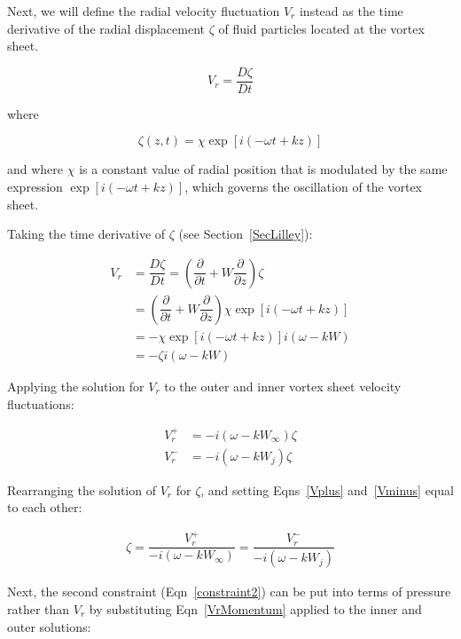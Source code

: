 \documentclass[]{aiaa-tc}%
\begin{document}
Next, we will define the radial velocity fluctuation $V_r$ instead as the time derivative of the radial displacement $\zeta$ of fluid particles located at the vortex sheet.

\begin{equation}
V_r = \dfrac{D\zeta}{Dt}
\end{equation}

\noindent where

\begin{equation}
\zeta(z,t) = \chi \exp[i(-\omega t + kz)]
\end{equation}

\noindent and where $\chi$ is a constant value of radial position that is modulated by the same expression $\exp[i(-\omega t + kz)]$, which governs the oscillation of the vortex sheet.

Taking the time derivative of $\zeta$ (see Section~\ref{SecLilley}):

\begin{align*}
V_r &= \dfrac{D\zeta}{Dt} =
    \left(\dfrac{\partial}{\partial t} + W \dfrac{\partial}{\partial z}\right)
    \zeta \\
    &=\left(\dfrac{\partial}{\partial t} + W \dfrac{\partial}{\partial z}\right)
    \chi \exp[i(-\omega t + kz)]  \\
&= -\chi \exp[i(-\omega t + kz)] i ( \omega - kW )  \\
&= -\zeta i ( \omega - kW )
\end{align*}

Applying the solution for $V_r$ to the outer and inner vortex sheet velocity fluctuations:

\begin{align}
V_r^+ &= -i(\omega - kW_{\infty} )\zeta  \label{Vplus}\\
V_r^- &= -i(\omega - kW_j )       \zeta  \label{Vminus}
\end{align}

Rearranging the solution of $V_r$ for $\zeta$, and setting Eqns~\ref{Vplus} and~\ref{Vminus} equal to each other:

\begin{align} \label{VrVel}
\boxed{\zeta = \dfrac{V_r^+}{-i(\omega - kW_{\infty})}
    = \dfrac{V_r^-}{-i(\omega - kW_{j})}}
\end{align}

Next, the second constraint (Eqn~\ref{constraint2}) can be put into terms of pressure rather than $V_r$ by substituting Eqn~\ref{VrMomentum} applied to the inner and outer solutions:
\end{document}
